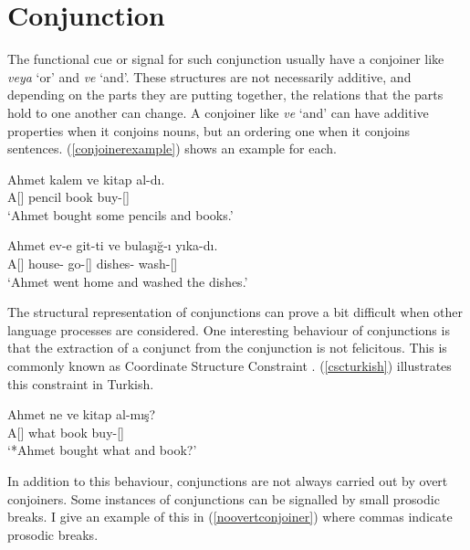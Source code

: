 \section{Conjunction}

The functional cue or signal for such conjunction usually have a conjoiner like \textit{veya} `or' and \textit{ve} `and'. These structures are not necessarily additive, and depending on the parts they are putting together, the relations that the parts hold to one another can change. A conjoiner like \textit{ve} `and' can have additive properties when it conjoins nouns, but an ordering one when it conjoins sentences. (\ref{conjoinerexample}) shows an example for each.

\begin{exe}
\ex \label{conjoinerexample}
\begin{xlist}
\ex \gll Ahmet kalem ve kitap al-dı. \\
A[{\Nom}] pencil {\And} book buy-{\Pst}[{\Tsg}] \\
\glt `Ahmet bought some pencils and books.'

\ex \gll Ahmet ev-e git-ti ve bulaşığ-ı yıka-dı. \\
A[{\Nom}] house-{\Dat} go-{\Pst}[{\Tsg}] {\And} dishes-{\Acc} wash-{\Pst}[{\Tsg}] \\
\glt `Ahmet went home and washed the dishes.'
\end{xlist}
\end{exe}

The structural representation of conjunctions can prove a bit difficult when other language processes are considered. One interesting behaviour of conjunctions is that the extraction of a conjunct from the conjunction is not felicitous. This is commonly known as Coordinate Structure Constraint \citep{ross1967constraints}. (\ref{cscturkish}) illustrates this constraint in Turkish.

\begin{exe}
\ex \label{cscturkish} 
\gll *Ahmet ne ve kitap al-mış? \\ 
A[{\Nom}] what {\And} book buy-{\Pst}[{\Tsg}] \\
\glt `*Ahmet bought what and book?'
\end{exe}

In addition to this behaviour, conjunctions are not always carried out by overt conjoiners. Some instances of conjunctions can be signalled by small prosodic breaks. I give an example of this in (\ref{noovertconjoiner}) where commas indicate prosodic breaks.

